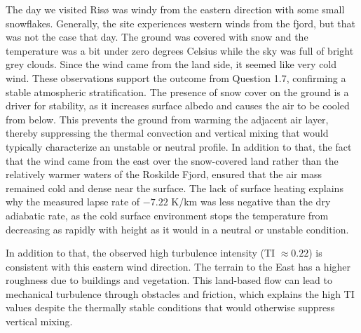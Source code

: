 The day we visited Risø was windy from the eastern direction with some small snowflakes. Generally, the site experiences western winds from the fjord, but that was not the case that day. The ground was covered with snow and the temperature was a bit under zero degrees Celsius while the sky was full of bright grey clouds. Since the wind came from the land side, it seemed like very cold wind.
These observations support the outcome from Question 1.7, confirming a stable atmospheric stratification. 
The presence of snow cover on the ground is a driver for stability, as it increases surface albedo and causes the air to be cooled from below. 
This prevents the ground from warming the adjacent air layer, thereby suppressing the thermal convection and vertical mixing that would typically characterize an unstable or neutral profile. 
In addition to that, the fact that the wind came from the east over the snow-covered land rather than the relatively warmer waters of the Roskilde Fjord, ensured that the air mass remained cold and dense near the surface. 
The lack of surface heating explains why the measured lapse rate of $-7.22$ K/km was less negative than the dry adiabatic rate, as the cold surface environment stops the temperature from decreasing as rapidly with height as it would in a neutral or unstable condition.

In addition to that, the observed high turbulence intensity (TI $\approx 0.22$) is consistent with this eastern wind direction. 
The terrain to the East has a higher roughness due to buildings and vegetation. This land-based flow can lead to mechanical turbulence through obstacles and friction, which explains the high TI values despite the thermally stable conditions that would otherwise suppress vertical mixing.
